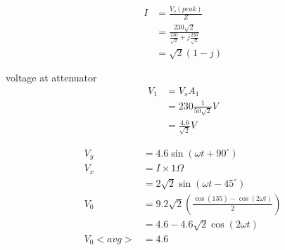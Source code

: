\documentclass[journal,12pt,twocolumn]{IEEEtran}
\theoremstyle{remark}
\begin{document}
\begin{center}
\begin{align}
     I &=\frac{V_s(peak)}{Z}\\
     &=\frac{230\sqrt{2}}{\frac{230}{\sqrt{2}}+j\frac{230}{\sqrt{2}}} \\
     &=\sqrt{2}(1-j)
\end{align}
\end{center}
voltage at attenuator 
\begin{align}
    V_1&=V_sA_1\\
    &=230\frac{1}{50\sqrt{2}}V\\
    &=\frac{4.6}{\sqrt{2}}V
\end{align}
\begin{center}
    \begin{align}
        V_y&=4.6\sin(\omega t+90^\circ)\\
        V_x&=I\times 1\Omega\\
        &=2\sqrt{2}\sin(\omega t-45^\circ)\\
        V_0&=9.2\sqrt{2}(\frac{\cos(135)-\cos(2\omega t)}{2})\\
        &=4.6-4.6\sqrt{2}\cos(2\omega t)\\
        V_0<avg>&=4.6
    \end{align}
\end{center}
\end{document}
